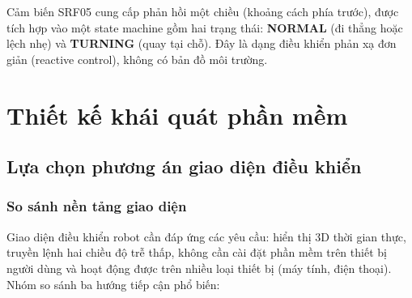         Cảm biến SRF05 cung cấp phản hồi một chiều (khoảng cách phía trước), được tích hợp vào một state machine gồm hai trạng thái: \textbf{NORMAL} (đi thẳng hoặc lệch nhẹ) và \textbf{TURNING} (quay tại chỗ). Đây là dạng điều khiển phản xạ đơn giản (reactive control), không có bản đồ môi trường.

    \section{Thiết kế khái quát phần mềm}

        \subsection{Lựa chọn phương án giao diện điều khiển}

            \subsubsection{So sánh nền tảng giao diện}

            \hspace{0.5cm} Giao diện điều khiển robot cần đáp ứng các yêu cầu: hiển thị 3D thời gian thực, truyền lệnh hai chiều độ trễ thấp, không cần cài đặt phần mềm trên thiết bị người dùng và hoạt động được trên nhiều loại thiết bị (máy tính, điện thoại). Nhóm so sánh ba hướng tiếp cận phổ biến:

